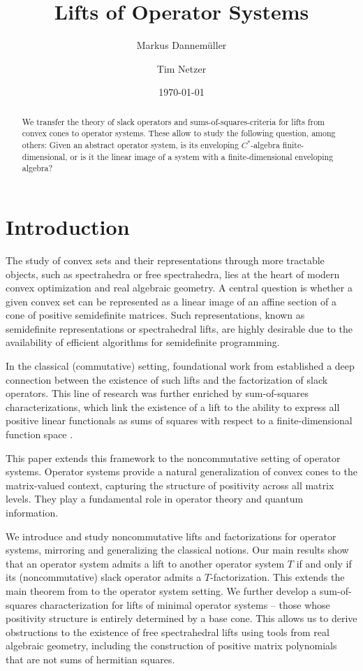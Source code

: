 \documentclass[11pt,onecolumn]{article}
\title{Lifts of Operator Systems}
\author{Markus Dannem\"uller}
\author{Tim Netzer}
\affil{\small Department of Mathematics, University of Innsbruck, Austria}
\date{\today}
\theoremstyle{plain}
\theoremstyle{definition}
\begin{document}
\maketitle
\begin{abstract}
We transfer the theory  of slack operators and sums-of-squares-criteria for lifts from   convex cones to operator systems. These allow to study the following question, among others: Given an abstract operator system, is its enveloping $C^*$-algebra  finite-dimensional, or is it the linear image of  a system with a finite-dimensional enveloping algebra?  
\end{abstract}

\section{Introduction}

The study of convex sets and their representations through more tractable objects, such as spectrahedra or free spectrahedra, lies at the heart of modern convex optimization and real algebraic geometry. A central question is whether a given convex set can be represented as a linear image of an affine section of a cone of positive semidefinite matrices. Such representations, known as semidefinite representations or spectrahedral lifts, are highly desirable due to the availability of efficient algorithms for semidefinite programming.

In the classical (commutative) setting, foundational work from \cite{GPT, yann} established a deep connection between the existence of such lifts and the factorization of slack operators. This line of research was further enriched by sum-of-squares characterizations, which link the existence of a lift to the ability to express all positive linear functionals as sums of squares with respect to a finite-dimensional function space \cite{faw, fgpst, schei}.

This paper extends this framework to the noncommutative setting of operator systems. Operator systems provide a natural generalization of convex cones to the matrix-valued context, capturing the structure of positivity across all matrix levels. They play a fundamental role in operator theory and quantum information.

We introduce and study noncommutative lifts and factorizations for operator systems, mirroring and generalizing the classical notions. Our main results show that an operator system admits a  lift to another operator system $T$ if and only if its (noncommutative) slack operator admits a $T$-factorization. This extends the main theorem from \cite{GPT} to the operator system setting. We further  develop a sum-of-squares characterization for lifts of minimal operator systems -- those whose positivity structure is entirely determined by a base cone. This allows us to derive obstructions to the existence of free spectrahedral lifts using tools from real algebraic geometry, including the construction of positive matrix polynomials that are not sums of hermitian squares.
\end{document}

